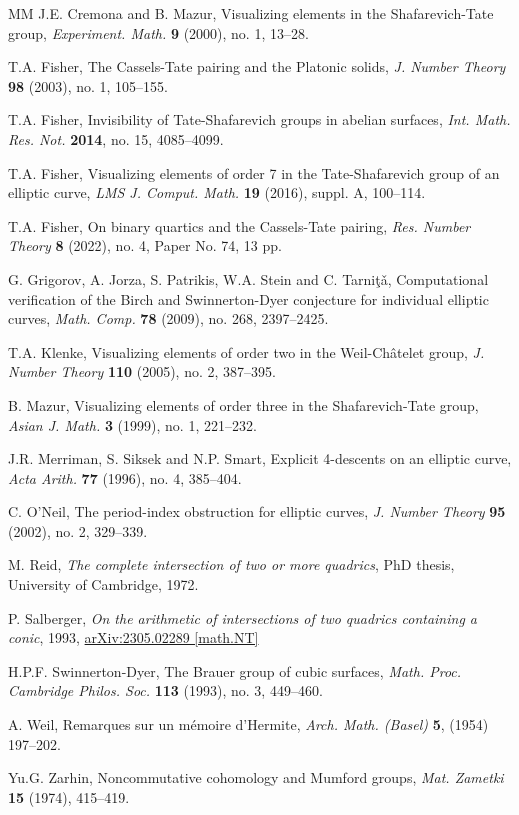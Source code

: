 \documentclass[12pt]{amsart}
\theoremstyle{definition}
\begin{document}
\begin{thebibliography}{MM}
J.E. Cremona and B. Mazur,
Visualizing elements in the Shafarevich-Tate group,
{\em Experiment. Math.} {\bf 9} (2000), no. 1, 13--28.

T.A. Fisher,
The Cassels-Tate pairing and the Platonic solids,
{\em J. Number Theory} {\bf 98} (2003), no. 1, 105--155.

T.A. Fisher,  
Invisibility of Tate-Shafarevich groups in abelian surfaces,
{\em Int. Math. Res. Not.} {\bf 2014}, no. 15, 4085--4099.

T.A. Fisher,
Visualizing elements of order 7 in the Tate-Shafarevich group
of an elliptic curve,
{\em LMS J. Comput. Math.} {\bf 19} (2016), suppl. A, 100--114.

T.A. Fisher, 
On binary quartics and the Cassels-Tate pairing,
{\em Res. Number Theory} {\bf 8} (2022), no. 4, Paper No. 74, 13 pp.

G. Grigorov, A. Jorza, S. Patrikis, W.A. Stein and C. Tarniţǎ,  
Computational verification of the Birch and Swinnerton-Dyer
conjecture for individual elliptic curves,
{\em Math. Comp.} {\bf 78} (2009), no. 268, 2397--2425.

T.A. Klenke,  
Visualizing elements of order two in the Weil-Ch\^atelet group,
{\em J. Number Theory} {\bf 110} (2005), no. 2, 387--395.

B. Mazur, 
Visualizing elements of order three in the Shafarevich-Tate group,
{\em Asian J. Math.} {\bf 3} (1999), no. 1, 221--232.

J.R. Merriman, S. Siksek and N.P. Smart,  
Explicit 4-descents on an elliptic curve,
{\em Acta Arith.} {\bf 77} (1996), no. 4, 385--404.

C. O'Neil,  
The period-index obstruction for elliptic curves,
{\em J. Number Theory} {\bf 95} (2002), no. 2, 329--339.

M. Reid,
{\em The complete intersection of two or more quadrics},
PhD thesis, University of Cambridge, 1972.

P. Salberger,
{\em On the arithmetic of intersections of two quadrics
containing a conic}, 1993, \url{arXiv:2305.02289 [math.NT]}

H.P.F. Swinnerton-Dyer, The Brauer group of cubic surfaces,
{\em Math. Proc. Cambridge Philos. Soc.} {\bf 113} (1993), no. 3, 449--460.

A. Weil, 
Remarques sur un m\'emoire d'Hermite,
{\em Arch. Math. (Basel)} {\bf{5}}, (1954) 197--202.

Yu.G. Zarhin,
Noncommutative cohomology and Mumford groups,
{\em Mat. Zametki} {\bf 15} (1974), 415--419.

\end{thebibliography}
\end{document}
